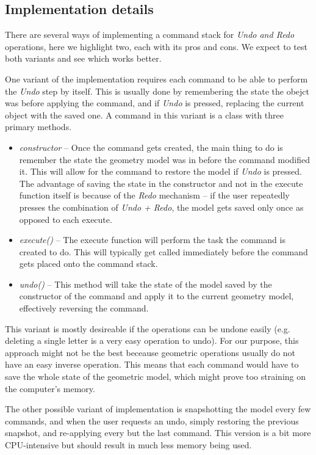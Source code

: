 \subsection*{Implementation details}

There are several ways of implementing a command stack for \textit{Undo and Redo} operations, here we highlight two, each with its pros and cons. We expect to test both variants and see which works better.

One variant of the implementation requires each command to be able to perform the \textit{Undo} step by itself. This is usually done by remembering the state the obejct was before applying the command, and if \textit{Undo} is pressed, replacing the current object with the saved one. A command in this variant is a class with three primary methods.
\begin{itemize}
\item \textit{constructor} -- Once the command gets created, the main thing to do is remember the state the geometry model was in before the command modified it. This will allow for the command to restore the model if \textit{Undo} is pressed. The advantage of saving the state in the constructor and not in the execute function itself is because of the \textit{Redo} mechanism -- if the user repeatedly presses the combination of \textit{Undo + Redo}, the model gets saved only once as opposed to each execute.
\item \textit{execute()} -- The execute function will perform the task the command is created to do. This will typically get called immediately before the command gets placed onto the command stack.
\item \textit{undo()} -- This method will take the state of the model saved by the constructor of the command and apply it to the current geometry model, effectively reversing the command.
\end{itemize}

This variant is mostly desireable if the operations can be undone easily (e.g. deleting a single letter is a very easy operation to undo). For our purpose, this approach might not be the best beceause geometric operations usually do not have an easy inverse operation. This means that each command would have to save the whole state of the geometric model, which might prove too straining on the computer's memory.

The other possible variant of implementation is snapshotting the model every few commands, and when the user requests an undo, simply restoring the previous snapshot, and re-applying every but the last command. This version is a bit more CPU-intensive but should result in much less memory being used.

